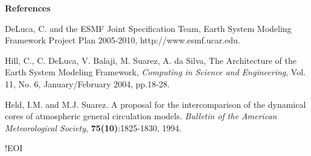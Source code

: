 \newpage

{\Large \bf References}


\begin{description}

\item DeLuca, C. and the ESMF Joint Specification Team, Earth System
Modeling Framework Project Plan 2005-2010, http://www.esmf.ucar.edu.

\item Hill, C., C. DeLuca, V. Balaji, M. Suarez, A. da Silva, The
Architecture of the Earth System Modeling Framework, {\em Computing in
Science and Engineering}, Vol. 11, No. 6, January/February 2004,
pp.18-28.

\item Held, I.M. and M.J. Suarez. A proposal for the intercomparison
  of the dynamical cores of atmospheric general circulation
  models. {\em Bulletin of the American Meteorological Society}, 
 {\bf 75(10)}:1825-1830, 1994.
 
\end{description}



!EOI


